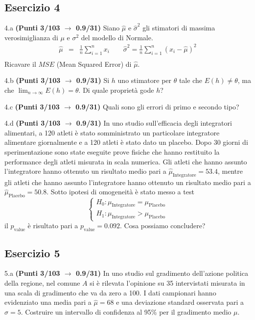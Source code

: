 \documentclass[
  11pt,
]{book}
\theoremstyle{mytheoremstyle}
\theoremstyle{mydefstyle}
\begin{document}
\subsection{Esercizio 4}\label{esercizio-4-21}

4.a \textbf{(Punti 3/103 \(\rightarrow\) 0.9/31)} Siano \(\hat \mu\) e \(\hat\sigma^2\) gli stimatori di massima verosimiglianza di \(\mu\) e \(\sigma^2\) del modello di Normale.
\begin{eqnarray*}
  \hat\mu &=&  \frac 1n\sum_{i=1}^nx_i \qquad \hat\sigma^2 =  \frac 1n\sum_{i=1}^n(x_i-\hat\mu)^2\\
\end{eqnarray*}
Ricavare il \(MSE\) (Mean Squared Error) di \(\hat\mu\).

4.b \textbf{(Punti 3/103 \(\rightarrow\) 0.9/31)} Si \(h\) uno stimatore per \(\theta\) tale che \(E(h)\ne\theta\), ma che \(\lim_{n\to\infty}E(h)=\theta\). Di quale proprietà gode \(h\)?

4.c \textbf{(Punti 3/103 \(\rightarrow\) 0.9/31)} Quali sono gli errori di primo e secondo tipo?

4.d \textbf{(Punti 3/103 \(\rightarrow\) 0.9/31)} In uno studio sull'efficacia degli integratori alimentari, a 120 atleti è stato somministrato un particolare integratore alimentare giornalmente e a 120 atleti è stato dato un placebo. Dopo 30 giorni di sperimentazione sono state eseguite prove fisiche che hanno restituito la performance degli atleti misurata in scala numerica. Gli atleti che hanno assunto l'integratore hanno ottenuto un risultato medio pari a \(\hat\mu_\text{Integratore}=53.4\), mentre gli atleti che hanno assunto l'integratore hanno ottenuto un risultato medio pari a \(\hat\mu_\text{Placebo}=50.8\).
Sotto ipotesi di omogeneità è stato messo a test
\[
\begin{cases}
H_0:\mu_\text{Integratore}=\mu_\text{Placebo}\\
H_1:\mu_\text{Integratore}>\mu_\text{Placebo}
\end{cases}
\]
il \(p_\text{value}\) è risultato pari a \(p_\text{value}=0.092\). Cosa possiamo concludere?

\subsection{Esercizio 5}\label{esercizio-5-19}

5.a \textbf{(Punti 3/103 \(\rightarrow\) 0.9/31)} In uno studio sul gradimento dell'azione politica della regione, nel comune \(A\) si è rilevata l'opinione su 35 intervistati misurata in una scala di gradimento che va da zero a 100. I dati campionari hanno evidenziato una media pari a \(\hat\mu=68\) e una deviazione standard osservata pari a \(\hat\sigma=5\).
Costruire un intervallo di confidenza al 95\% per il gradimento medio \(\mu\).
\end{document}
